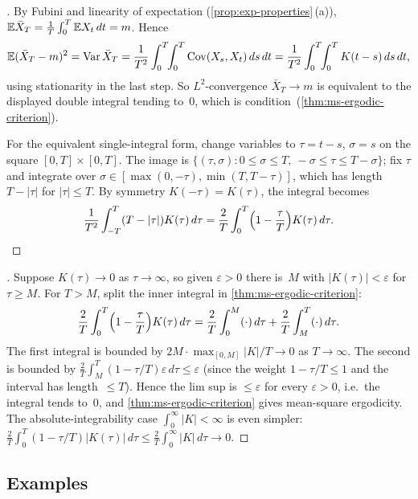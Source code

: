 \begin{proof}[]
By Fubini and linearity of expectation
(\cref{prop:exp-properties}\,(a)),
$\mathbb{E} \bar X_T = \frac{1}{T} \int_0^T \mathbb{E} X_t\, dt = m$. Hence
\[
  \mathbb{E} (\bar X_T - m)^2 = \operatorname{Var} \bar X_T = \frac{1}{T^2} \int_0^T \!\!\int_0^T \operatorname{Cov}(X_s, X_t)\, ds\, dt = \frac{1}{T^2} \int_0^T \!\!\int_0^T K(t - s)\, ds\, dt,
\]
using stationarity in the last step. So $L^2$-convergence
$\bar X_T \to m$ is equivalent to the displayed double integral
tending to~$0$, which is condition~(\ref{thm:ms-ergodic-criterion}).

For the equivalent single-integral form, change variables to
$\tau = t - s$, $\sigma = s$ on the square
$[0, T] \times [0, T]$. The image is
$\{(\tau, \sigma) : 0 \leq \sigma \leq T,\ -\sigma \leq \tau \leq T - \sigma\}$;
fix $\tau$ and integrate over $\sigma \in [\max(0, -\tau), \min(T, T - \tau)]$,
which has length $T - |\tau|$ for $|\tau| \leq T$. By symmetry
$K(-\tau) = K(\tau)$, the integral becomes
\[
  \frac{1}{T^2} \int_{-T}^{T} (T - |\tau|) K(\tau)\, d\tau = \frac{2}{T} \int_0^T \Bigl(1 - \frac{\tau}{T}\Bigr) K(\tau)\, d\tau. \qedhere
\]
\end{proof}

\begin{proof}[]
Suppose $K(\tau) \to 0$ as $\tau \to \infty$, so given $\varepsilon > 0$
there is~$M$ with $|K(\tau)| < \varepsilon$ for $\tau \geq M$. For
$T > M$, split the inner integral in
\cref{thm:ms-ergodic-criterion}:
\[
  \frac{2}{T} \int_0^T \Bigl(1 - \frac{\tau}{T}\Bigr) K(\tau)\, d\tau = \frac{2}{T} \int_0^M (\cdot)\, d\tau + \frac{2}{T} \int_M^T (\cdot)\, d\tau.
\]
The first integral is bounded by $2M \cdot \max_{[0, M]} |K|/T \to 0$
as $T \to \infty$. The second is bounded by
$\frac{2}{T} \int_M^T (1 - \tau/T) \varepsilon\, d\tau \leq \varepsilon$
(since the weight $1 - \tau/T \leq 1$ and the interval has
length~$\leq T$). Hence the lim sup is $\leq \varepsilon$ for every
$\varepsilon > 0$, i.e.\ the integral tends to~$0$, and
\cref{thm:ms-ergodic-criterion} gives mean-square ergodicity. The
absolute-integrability case $\int_0^{\infty} |K| < \infty$ is even
simpler: $\frac{2}{T} \int_0^T (1 - \tau/T) |K(\tau)|\, d\tau \leq \frac{2}{T} \int_0^{\infty} |K|\, d\tau \to 0$.
\end{proof}

\subsection*{Examples}

